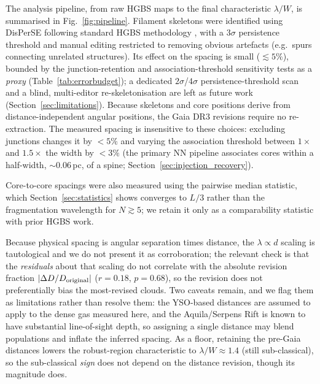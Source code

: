 \documentclass[usenatbib,twoside,twocolumn]{mnras}
\begin{document}
The analysis pipeline, from raw HGBS maps to the final characteristic $\lambda/W$, is summarised in Fig.~\ref{fig:pipeline}. Filament skeletons were identified using DisPerSE \citep{Sousbie2011} following standard HGBS methodology \citep{Arzoumanian2011}, with a $3\sigma$ persistence threshold and manual editing restricted to removing obvious artefacts (e.g.\ spurs connecting unrelated structures). Its effect on the spacing is small ($\lesssim5\%$), bounded by the junction-retention and association-threshold sensitivity tests as a \emph{proxy} (Table~\ref{tab:errorbudget}); a dedicated $2\sigma$/$4\sigma$ persistence-threshold scan and a blind, multi-editor re-skeletonisation are left as future work (Section~\ref{sec:limitations}). Because skeletons and core positions derive from distance-independent angular positions, the Gaia DR3 revisions require no re-extraction. The measured spacing is insensitive to these choices: excluding junctions changes it by $<5\%$ and varying the association threshold between $1\times$ and $1.5\times$ the width by $<3\%$ (the primary NN pipeline associates cores within a half-width, $\sim0.06$\,pc, of a spine; Section~\ref{sec:injection_recovery}).

Core-to-core spacings were also measured using the pairwise median statistic, which Section~\ref{sec:statistics} shows converges to $L/3$ rather than the fragmentation wavelength for $N\gtrsim5$; we retain it only as a comparability statistic with prior HGBS work.

Because physical spacing is angular separation times distance, the $\lambda\propto d$ scaling is tautological and we do not present it as corroboration; the relevant check is that the \emph{residuals} about that scaling do not correlate with the absolute revision fraction $|\Delta D/D_{\rm original}|$ ($r=0.18$, $p=0.68$), so the revision does not preferentially bias the most-revised clouds. Two caveats remain, and we flag them as limitations rather than resolve them: the YSO-based distances \citep{Zhang2023} are assumed to apply to the dense gas measured here, and the Aquila/Serpens Rift is known to have substantial line-of-sight depth, so assigning a single distance may blend populations and inflate the inferred spacing. As a floor, retaining the pre-Gaia distances lowers the robust-region characteristic to $\lambda/W\approx1.4$ (still sub-classical), so the sub-classical \emph{sign} does not depend on the distance revision, though its magnitude does.
\end{document}
